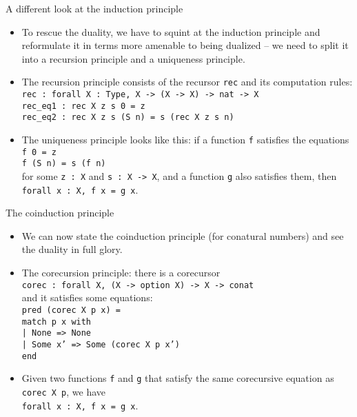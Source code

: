 \documentclass{beamer}
\begin{document}
\begin{frame}{A different look at the induction principle}
\begin{itemize}
	\item To rescue the duality, we have to squint at the induction principle and reformulate it in terms more amenable to being dualized -- we need to split it into a recursion principle and a uniqueness principle.
	\item The recursion principle consists of the recursor \texttt{rec} and its computation rules: \\
	\texttt{rec :\ forall X :\ Type, X -> (X -> X) -> nat -> X} \\
	\texttt{rec\_eq1 :\ rec X z s 0 = z} \\
	\texttt{rec\_eq2 :\ rec X z s (S n) = s (rec X z s n)}
	\item The uniqueness principle looks like this: if a function \texttt{f} satisfies the equations \\
	\texttt{f 0 = z} \\
	\texttt{f (S n) = s (f n)} \\
	for some \texttt{z :\ X} and \texttt{s :\ X -> X}, and a function \texttt{g} also satisfies them, then \texttt{forall x :\ X, f x = g x}.
\end{itemize}
\end{frame}

\begin{frame}{The coinduction principle}
\begin{itemize}
	\item We can now state the coinduction principle (for conatural numbers) and see the duality in full glory.
	\item The corecursion principle: there is a corecursor \\
	\texttt{corec :\ forall X, (X -> option X) -> X -> conat} \\
	and it satisfies some equations: \\
	\texttt{pred (corec X p x) =\\
	match p x with \\
	| None => None \\
	| Some x' => Some (corec X p x') \\
	end}
	\item Given two functions \texttt{f} and \texttt{g} that satisfy the same corecursive equation as \texttt{corec X p}, we have \\
	\texttt{forall x :\ X, f x = g x}.
\end{itemize}
\end{frame}
\end{document}
